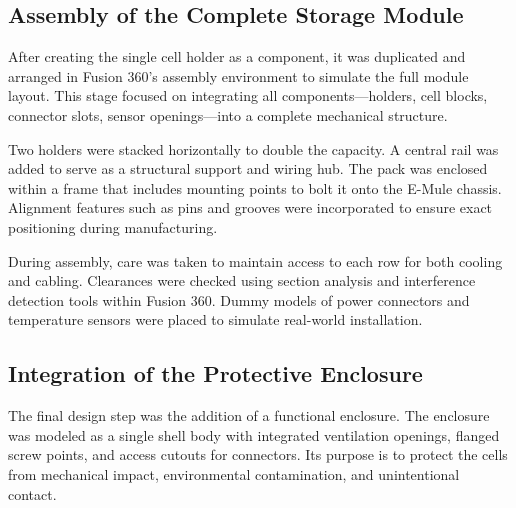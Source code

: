 
\addtocounter{page}{1} %
\subsection{Assembly of the Complete Storage Module}

After creating the single cell holder as a component, it was duplicated and arranged in Fusion 360’s assembly environment to simulate the full module layout. This stage focused on integrating all components—holders, cell blocks, connector slots, sensor openings—into a complete mechanical structure.

Two holders were stacked horizontally to double the capacity. A central rail was added to serve as a structural support and wiring hub. The pack was enclosed within a frame that includes mounting points to bolt it onto the E-Mule chassis. Alignment features such as pins and grooves were incorporated to ensure exact positioning during manufacturing.

During assembly, care was taken to maintain access to each row for both cooling and cabling. Clearances were checked using section analysis and interference detection tools within Fusion 360. Dummy models of power connectors and temperature sensors were placed to simulate real-world installation.


\addtocounter{page}{1}

\subsection{Integration of the Protective Enclosure}

The final design step was the addition of a functional enclosure. The enclosure was modeled as a single shell body with integrated ventilation openings, flanged screw points, and access cutouts for connectors. Its purpose is to protect the cells from mechanical impact, environmental contamination, and unintentional contact.

